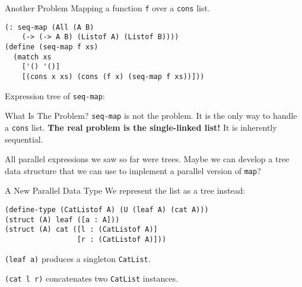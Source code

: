 \documentclass{beamer}
\begin{document}
\begin{frame}[fragile]{Another Problem}
Mapping a function \lstinline{f} over a \lstinline{cons} list.

\begin{lstlisting}
(: seq-map (All (A B)
    (-> (-> A B) (Listof A) (Listof B))))
(define (seq-map f xs)
  (match xs
    ['() '()]
    [(cons x xs) (cons (f x) (seq-map f xs))]))
\end{lstlisting}

\pause{} \vspace{.5cm}

Expression tree of \lstinline{seq-map}:

  \begin{center}
  \end{center}
\end{frame}

\begin{frame}{What Is The Problem?}
  \lstinline{seq-map} is not the problem. It is the only way to handle a \lstinline{cons} list. \textbf{The real problem is the single-linked list!} It is inherently sequential.

\pause{} \vspace{1cm}

All parallel expressions we saw so far were trees. Maybe we can develop a tree data structure that we can use to implement a parallel version of \lstinline{map}?
\end{frame}

\begin{frame}[fragile]{A New Parallel Data Type}
We represent the list as a tree instead:
\begin{lstlisting}
(define-type (CatListof A) (U (leaf A) (cat A)))
(struct (A) leaf ([a : A]))
(struct (A) cat ([l : (CatListof A)]
                 [r : (CatListof A)]))
\end{lstlisting}

\pause{} \vspace{.5cm}

\lstinline{(leaf a)} produces a singleton \lstinline{CatList}.

\lstinline{(cat l r)} concatenates two \lstinline{CatList} instances.
\end{frame}
\end{document}
